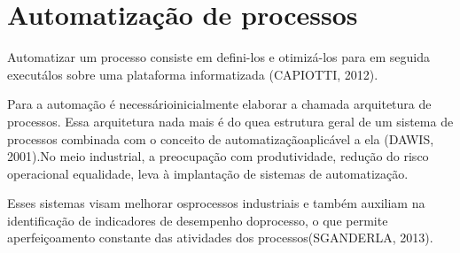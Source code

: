 \vspace{-42pt}
\section[Automatização de processos]{Automatização de processos}
Automatizar um processo consiste em defini-los e otimizá-los para em seguida executálos sobre uma plataforma informatizada (CAPIOTTI, 2012). 

Para a automação é necessárioinicialmente elaborar a chamada arquitetura de processos. Essa arquitetura nada mais é do quea estrutura geral de um sistema de processos combinada com o conceito de automatizaçãoaplicável a ela (DAWIS, 2001).No meio industrial, a preocupação com produtividade, redução do risco operacional equalidade, leva à implantação de sistemas de automatização. 

Esses sistemas visam melhorar osprocessos industriais e também auxiliam na identificação de indicadores de desempenho doprocesso, o que permite aperfeiçoamento constante das atividades dos processos(SGANDERLA, 2013).